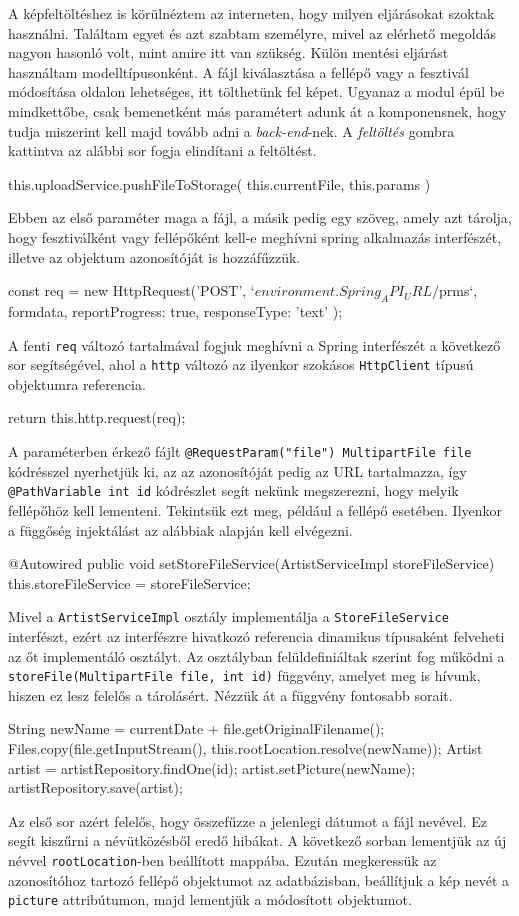 A képfeltöltéshez is körülnéztem az interneten, hogy milyen eljárásokat szoktak használni. Találtam egyet és azt szabtam személyre, mivel az elérhető megoldás nagyon hasonló volt, mint amire itt van szükség. Külön mentési eljárást használtam modelltípusonként. A fájl kiválasztása a fellépő vagy a fesztivál módosítása oldalon lehetséges, itt tölthetünk fel képet. Ugyanaz a modul épül be mindkettőbe, csak bemenetként más paramétert adunk át a komponensnek, hogy tudja miszerint kell majd tovább adni a \textit{back-end}-nek. A \textit{feltöltés} gombra kattintva az alábbi sor fogja elindítani a feltöltést.
\begin{java}
this.uploadService.pushFileToStorage(
    this.currentFile, this.params
)
\end{java}
Ebben az első paraméter maga a fájl, a másik pedig egy szöveg, amely azt tárolja, hogy fesztiválként vagy fellépőként kell-e meghívni spring alkalmazás interfészét, illetve az objektum azonosítóját is hozzáfűzzük.
\begin{java}
const req = new HttpRequest('POST', 
`${environment.Spring_API_URL}/${prms}`, formdata, {
    reportProgress: true,
    responseType: 'text'
});
\end{java}
A fenti \texttt{req} változó tartalmával fogjuk meghívni a Spring interfészét a következő sor segítségével, ahol a \texttt{http} változó az ilyenkor szokásos \texttt{HttpClient} típusú objektumra referencia. 
\begin{java}
return this.http.request(req);
\end{java}
A paraméterben érkező fájlt \texttt{@RequestParam("file") MultipartFile file} kódrésszel nyerhetjük ki, az az azonosítóját pedig az URL tartalmazza, így \texttt{@PathVariable int id} kódrészlet segít nekünk megszerezni, hogy melyik fellépőhöz kell lementeni.
Tekintsük ezt meg, például a fellépő esetében. Ilyenkor a függőség injektálást az alábbiak alapján kell elvégezni.
\begin{java}
@Autowired
public void setStoreFileService(ArtistServiceImpl 
storeFileService) {
    this.storeFileService = storeFileService;
} 
\end{java}
Mivel a \texttt{ArtistServiceImpl} osztály implementálja a \texttt{StoreFileService} interfészt, ezért az interfészre hivatkozó referencia dinamikus típusaként felveheti az őt implementáló osztályt. Az osztályban felüldefiniáltak szerint fog működni a \texttt{storeFile(MultipartFile file, int id)} függvény, amelyet meg is hívunk, hiszen ez lesz felelős a tárolásért. Nézzük át a függvény fontosabb sorait.
\begin{java}
String newName = currentDate + file.getOriginalFilename();
Files.copy(file.getInputStream(),
this.rootLocation.resolve(newName));
Artist artist = artistRepository.findOne(id);
artist.setPicture(newName);
artistRepository.save(artist);
\end{java}
Az első sor azért felelős, hogy összefűzze a jelenlegi dátumot a fájl nevével. Ez segít kiszűrni a névütközésből eredő hibákat. A következő sorban lementjük az új névvel \texttt{rootLocation}-ben beállított mappába. Ezután megkeressük az azonosítóhoz tartozó fellépő objektumot az adatbázisban, beállítjuk a kép nevét a \texttt{picture} attribútumon, majd lementjük a módosított objektumot.

